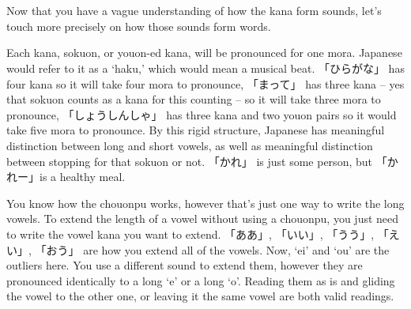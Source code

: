 \section[伯]{}\label{sec:PR仮名伯}

Now that you have a vague understanding of how the kana form sounds, let's touch more precisely on how those sounds form words.

Each kana, sokuon, or youon-ed kana, will be pronounced for one mora. Japanese would refer to it as a `haku,' which would mean a musical beat. 「ひらがな」 has four kana so it will take four mora to pronounce, 「まって」 has three kana -- yes that sokuon counts as a kana for this counting -- so it will take three mora to pronounce, 「しょうしんしゃ」 has three kana and two youon pairs so it would take five mora to pronounce. By this rigid structure, Japanese has meaningful distinction between long and short vowels, as well as meaningful distinction between stopping for that sokuon or not. 「かれ」 is just some person, but 「かれー」is a healthy meal.

You know how the chouonpu works, however that's just one way to write the long vowels. To extend the length of a vowel without using a chouonpu, you just need to write the vowel kana you want to extend. 「ああ」, 「いい」, 「うう」, 「えい」, 「おう」 are how you extend all of the vowels. Now, `ei' and `ou' are the outliers here. You use a different sound to extend them, however they are pronounced identically to a long `e' or a long `o'. Reading them as is and gliding the vowel to the other one, or leaving it the same vowel are both valid readings.
